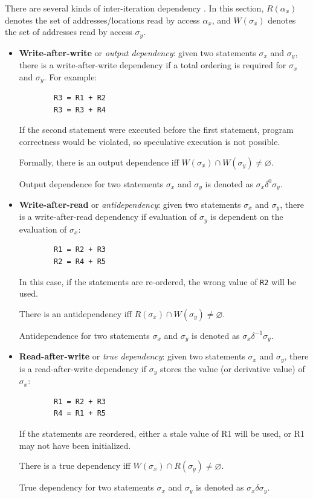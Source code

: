 	There are several kinds of inter-iteration dependency \citep[p.~526]{Ibbett2009,ArchitectureBook}. In this section, $R(\alpha_x)$ denotes the set of addresses/locations read by access $\alpha_x$, and $W(\sigma_x)$ denotes the set of addresses read by access $\sigma_y$.
	
	\begin{itemize}\label{fig:dep-kinds}
		\item \textbf{Write-after-write} or \textit{output dependency}: given two statements $\sigma_x$ and $\sigma_y$, there is a write-after-write dependency if a total ordering is required for $\sigma_x$ and $\sigma_y$. For example:
		
		\begin{verbatim}
		R3 = R1 + R2
		R3 = R3 + R4
		\end{verbatim}
		
		If the second statement were executed before the first statement, program correctness would be violated, so speculative execution is not possible.
		
		Formally, there is an output dependence iff $W(\sigma_x) \cap W(\sigma_y) \neq \varnothing$.
		
		Output dependence for two statements $\sigma_x$ and $\sigma_y$ is denoted as $\sigma_x \delta^0 \sigma_y$.
		
		\item \textbf{Write-after-read} or \textit{antidependency}: given two statements $\sigma_x$ and $\sigma_y$, there is a write-after-read dependency if evaluation of $\sigma_y$ is dependent on the evaluation of $\sigma_x$:
		
		\begin{verbatim}
		R1 = R2 + R3
		R2 = R4 + R5
		\end{verbatim}
		
		In this case, if the statements are re-ordered, the wrong value of \texttt{R2} will be used.
		
		There is an antidependency iff $R(\sigma_x) \cap W(\sigma_y) \neq \varnothing$.
		
		Antidependence for two statements $\sigma_x$ and $\sigma_y$ is denoted as $\sigma_x \delta^{-1} \sigma_y$.
		
		\item \textbf{Read-after-write} or \textit{true dependency}: given two statements $\sigma_x$ and $\sigma_y$, there is a read-after-write dependency if $\sigma_y$ stores the value (or derivative value) of $\sigma_x$:
		
		\begin{verbatim}
		R1 = R2 + R3
		R4 = R1 + R5
		\end{verbatim}
		
		If the statements are reordered, either a stale value of R1 will be used, or R1 may not have been initialized.
		
		There is a true dependency iff $W(\sigma_x) \cap R(\sigma_y) \neq \varnothing$.
		
		True dependency for two statements $\sigma_x$ and $\sigma_y$ is denoted as $\sigma_x \delta \sigma_y$.
	\end{itemize}
	
